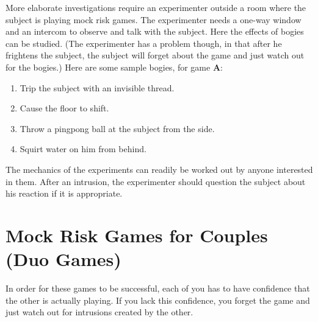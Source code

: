 More elaborate investigations require an experimenter outside a room
where the subject is playing mock risk games. The experimenter needs a
one-way window and an intercom to observe and talk with the subject. Here
the effects of bogies can be studied. (The experimenter has a problem 
though, in that after he frightens the subject, the subject will forget about
the game and just watch out for the bogies.) Here are some sample bogies,
for game \textbf{A}:
\lilskip
\begin{enumerate}
	\item Trip the subject with an invisible thread.
	\item Cause the floor to shift.
	\item Throw a pingpong ball at the subject from the side.
	\item Squirt water on him from behind.
\end{enumerate}
\lilskip
The mechanics of the experiments can readily be 
worked out by anyone interested in them. After an intrusion, the 
experimenter should question the subject about his reaction if it is
appropriate.

\section{Mock Risk Games for Couples (Duo Games)}

In order for these games to 
be successful,  each of you has to have confidence that the other is actually
playing. If you lack this confidence, you forget the game and just watch out
for intrusions created by the other.

